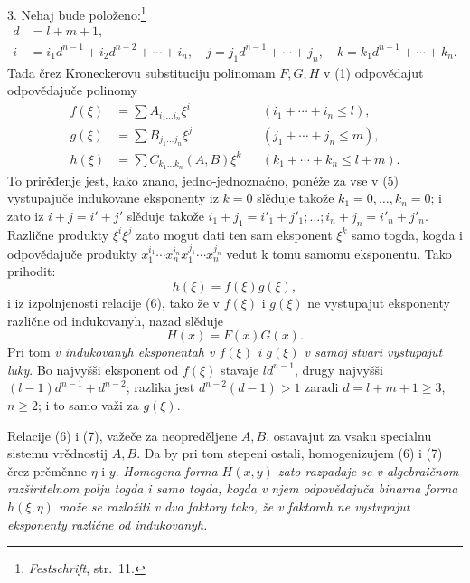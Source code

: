 \documentclass[11pt]{article}
\begin{document}
3. Nehaj bude položeno:\footnote{\emph{Festschrift}, str.~11.}
\begin{equation}
\begin{aligned}
 d&=l+m+1,\\
 i&=i_1d^{n-1}+i_2d^{n-2}+\cdots+i_n,\quad
 j=j_1d^{n-1}+\cdots+j_n,\quad
 k=k_1d^{n-1}+\cdots+k_n.
\end{aligned}
\tag{4}
\end{equation}
Tada črez Kroneckerovu substituciju polinomam $F,G,H$ v (1) odpovědajut odpovědajuče polinomy
\begin{equation}
\begin{aligned}
 f(\xi)&=\sum A_{i_1\ldots i_n}\xi^i &&(i_1+\cdots+i_n\le l),\\
 g(\xi)&=\sum B_{j_1\ldots j_n}\xi^j &&(j_1+\cdots+j_n\le m),\\
 h(\xi)&=\sum C_{k_1\ldots k_n}(A,B)\xi^k &&(k_1+\cdots+k_n\le l+m).
\end{aligned}
\tag{5}
\end{equation}
To prirěđenje jest, kako znano, jedno-jednoznačno, poněže za vse v (5) vystupajuče indukovane eksponenty iz $k=0$ slěduje takože $k_1=0,\ldots,k_n=0$; i zato iz $i+j=i'+j'$ slěduje takože $i_1+j_1=i'_1+j'_1;\ldots;i_n+j_n=i'_n+j'_n$. Različne produkty $\xi^i\xi^j$ zato mogut dati ten sam eksponent $\xi^k$ samo togda, kogda i odpovědajuče produkty $x_1^{i_1}\cdots x_n^{i_n}x_1^{j_1}\cdots x_n^{j_n}$ vedut k tomu samomu eksponentu. Tako prihodit:
\begin{equation}
 h(\xi)=f(\xi)g(\xi),
\tag{6}
\end{equation}
i iz izpolnjenosti relacije (6), tako že v $f(\xi)$ i $g(\xi)$ ne vystupajut eksponenty različne od indukovanyh, nazad slěduje
\begin{equation}
 H(x)=F(x)G(x).
\tag{7}
\end{equation}
Pri tom \emph{v indukovanyh eksponentah v $f(\xi)$ i $g(\xi)$ v samoj stvari vystupajut luky}. Bo najvyšši eksponent od $f(\xi)$ stavaje $ld^{n-1}$, drugy najvyšši $(l-1)d^{n-1}+d^{n-2}$; razlika jest $d^{n-2}(d-1)>1$ zaradi $d=l+m+1\ge3$, $n\ge2$; i to samo važi za $g(\xi)$.

Relacije (6) i (7), važeče za neopreděljene $A,B$, ostavajut za vsaku specialnu sistemu vrědnostij $A,B$. Da by pri tom stepeni ostali, homogenizujem (6) i (7) črez prěměnne $\eta$ i $y$. \emph{Homogena forma $H(x,y)$ zato razpadaje se v algebraičnom razširitelnom polju togda i samo togda, kogda v njem odpovědajuča binarna forma $h(\xi,\eta)$ može se razložiti v dva faktory tako, že v faktorah ne vystupajut eksponenty različne od indukovanyh.}
\end{document}
